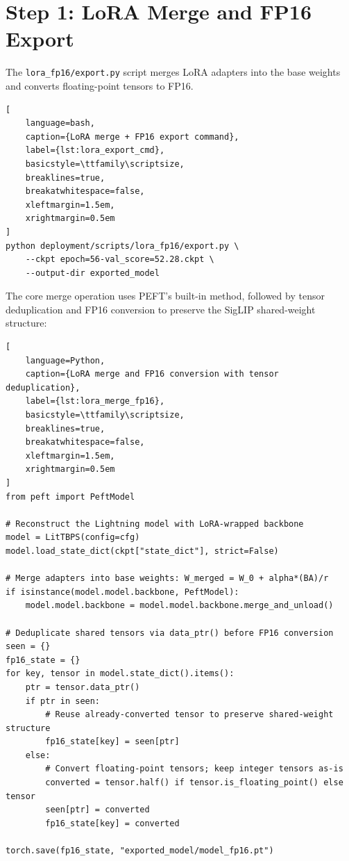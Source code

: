 \documentclass[../main.tex]{subfiles}
\begin{document}
\section{Step 1: LoRA Merge and FP16 Export}

\noindent The \texttt{lora\_fp16/export.py} script merges LoRA adapters into the base weights and converts floating-point tensors to FP16.

\begin{lstlisting}[
    language=bash,
    caption={LoRA merge + FP16 export command},
    label={lst:lora_export_cmd},
    basicstyle=\ttfamily\scriptsize,
    breaklines=true,
    breakatwhitespace=false,
    xleftmargin=1.5em,
    xrightmargin=0.5em
]
python deployment/scripts/lora_fp16/export.py \
    --ckpt epoch=56-val_score=52.28.ckpt \
    --output-dir exported_model
\end{lstlisting}

\noindent The core merge operation uses PEFT's built-in method, followed by tensor deduplication and FP16 conversion to preserve the SigLIP shared-weight structure:

\begin{lstlisting}[
    language=Python,
    caption={LoRA merge and FP16 conversion with tensor deduplication},
    label={lst:lora_merge_fp16},
    basicstyle=\ttfamily\scriptsize,
    breaklines=true,
    breakatwhitespace=false,
    xleftmargin=1.5em,
    xrightmargin=0.5em
]
from peft import PeftModel

# Reconstruct the Lightning model with LoRA-wrapped backbone
model = LitTBPS(config=cfg)
model.load_state_dict(ckpt["state_dict"], strict=False)

# Merge adapters into base weights: W_merged = W_0 + alpha*(BA)/r
if isinstance(model.model.backbone, PeftModel):
    model.model.backbone = model.model.backbone.merge_and_unload()

# Deduplicate shared tensors via data_ptr() before FP16 conversion
seen = {}
fp16_state = {}
for key, tensor in model.state_dict().items():
    ptr = tensor.data_ptr()
    if ptr in seen:
        # Reuse already-converted tensor to preserve shared-weight structure
        fp16_state[key] = seen[ptr]
    else:
        # Convert floating-point tensors; keep integer tensors as-is
        converted = tensor.half() if tensor.is_floating_point() else tensor
        seen[ptr] = converted
        fp16_state[key] = converted

torch.save(fp16_state, "exported_model/model_fp16.pt")
\end{lstlisting}
\end{document}
